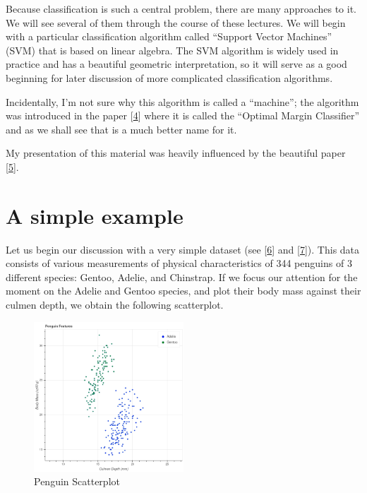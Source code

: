 \documentclass[
  oneside]{scrbook}
\begin{document}
Because classification is such a central problem, there are many
approaches to it. We will see several of them through the course of
these lectures. We will begin with a particular classification algorithm
called ``Support Vector Machines'' (SVM) that is based on linear
algebra. The SVM algorithm is widely used in practice and has a
beautiful geometric interpretation, so it will serve as a good beginning
for later discussion of more complicated classification algorithms.

Incidentally, I'm not sure why this algorithm is called a ``machine'';
the algorithm was introduced in the paper
{[}\protect\hyperlink{ref-vapnik92}{4}{]} where it is called the
``Optimal Margin Classifier'' and as we shall see that is a much better
name for it.

My presentation of this material was heavily influenced by the beautiful
paper {[}\protect\hyperlink{ref-bennettDuality}{5}{]}.

\hypertarget{a-simple-example}{%
\section{A simple example}\label{a-simple-example}}

Let us begin our discussion with a very simple dataset (see
{[}\protect\hyperlink{ref-penguins}{6}{]} and
{[}\protect\hyperlink{ref-penguindata}{7}{]}). This data consists of
various measurements of physical characteristics of 344 penguins of 3
different species: Gentoo, Adelie, and Chinstrap. If we focus our
attention for the moment on the Adelie and Gentoo species, and plot
their body mass against their culmen depth, we obtain the following
scatterplot.

\begin{figure}
\hypertarget{fig:penguins}{%
\centering
\includegraphics[width=0.5\textwidth,height=\textheight]{img/penguins.png}
\caption{Penguin Scatterplot}\label{fig:penguins}
}
\end{figure}
\end{document}
